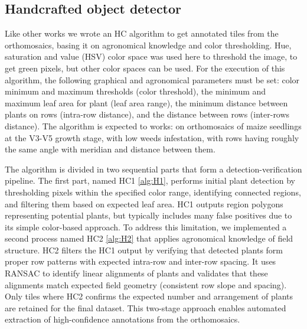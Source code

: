 \documentclass[12pt,a4paper,oneside]{report}
\begin{document}
\subsection{Handcrafted object detector}

Like other works \cite{davidPlantDetectionCounting2021,garcia-martinezDigitalCountCorn2020,liuEstimatingMaizeSeedling2022} 
we wrote an HC algorithm to get annotated tiles from the orthomosaics, 
basing it on agronomical knowledge and color thresholding.
Hue, saturation and value (HSV) color space was used here to threshold the image,
to get green pixels, but other color spaces can be used.
For the execution of this algorithm, the following graphical and agronomical 
parameters must be set: color minimum and maximum thresholds (color threshold), the minimum and maximum 
leaf area for plant (leaf area range), the minimum distance between plants on rows (intra-row distance),
and the distance between rows (inter-rows distance). 
The algorithm is expected to works: on orthomosaics of maize seedlings at the V3-V5 growth stage,
with low weeds infestation, with rows having roughly the same angle with meridian and distance between them.

The algorithm is divided in two sequential parts that form a detection-verification pipeline. The first part,
named HC1 \cref{alg:H1}, performs initial plant detection by thresholding pixels within the specified color range, 
identifying connected regions, and filtering them based on expected leaf area. HC1 outputs region polygons
representing potential plants, but typically includes many false positives due to its simple color-based approach.
To address this limitation, we implemented a second process named HC2 \cref{alg:H2} that applies agronomical 
knowledge of field structure. HC2 filters the HC1 output by verifying that detected plants form proper row 
patterns with expected intra-row and inter-row spacing. It uses RANSAC to identify linear alignments of plants 
and validates that these alignments match expected field geometry (consistent row slope and spacing).
Only tiles where HC2 confirms the expected number and arrangement of plants are retained for the final dataset.
This two-stage approach enables automated extraction of high-confidence annotations from the orthomosaics.
\end{document}
